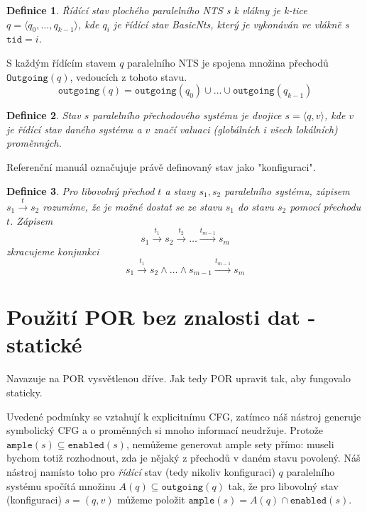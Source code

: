 \documentclass[10pt,a4paper,notitlepage]{report}
\newtheorem{definition}{Definice}
\newcommand{\tuple}[1]{\langle #1 \rangle}
\begin{document}
\begin{definition}
Řídící stav plochého paralelního NTS s k vlákny je k-tice $q = \tuple{q_0, \ldots, q_{k-1}}$, kde $q_i$ je řídící stav BasicNts, který je vykonáván ve vlákně s $\texttt{tid} = i$.
\end{definition}
S každým řídícím stavem $q$ paralelního NTS je spojena množina přechodů $\texttt{Outgoing}(q)$, vedoucích z tohoto stavu.
\begin{equation}
\texttt{outgoing}(q) = \texttt{outgoing}(q_0) \cup \ldots \cup \texttt{outgoing}(q_{k-1})
\end{equation}

\begin{definition}
Stav $s$ paralelního přechodového systému je dvojice $s = \tuple{q, v}$, kde $v$ je řídící stav daného systému a $v$ značí valuaci (globálních i všech lokálních) proměnných.
\end{definition}
Referenční manuál označujuje právě definovaný stav jako "konfiguraci".

\begin{definition}
Pro libovolný přechod $t$ a stavy $s_1, s_2$ paralelního systému, zápisem $s_1 \xrightarrow{t} s_2$ rozumíme, že je možné dostat se ze stavu $s_1$ do stavu $s_2$ pomocí přechodu $t$. Zápisem
\begin{equation*}
s_1 \xrightarrow{t_1} s_2 \xrightarrow{t_2} \ldots \xrightarrow{t_{m-1}} s_m
\end{equation*}
zkracujeme konjunkci
\begin{equation*}
s_1 \xrightarrow{t_1} s_2 \land \ldots \land s_{m-1} \xrightarrow{t_{m-1}} s_m
\end{equation*}
\end{definition}

\section{Použití POR bez znalosti dat - statické}
Navazuje na POR vysvětlenou dříve. Jak tedy POR upravit tak, aby fungovalo staticky.


Uvedené podmínky se vztahují k explicitnímu CFG, zatímco náš nástroj generuje symbolický CFG a o proměnných si mnoho informací neudržuje. Protože $\texttt{ample}(s) \subseteq \texttt{enabled}(s)$, nemůžeme generovat ample sety přímo: museli bychom totiž rozhodnout, zda je nějaký z přechodů v daném stavu povolený. Náš nástroj namísto toho pro \textit{řídící} stav (tedy nikoliv konfiguraci) $q$ paralelního systému spočítá množinu $A(q) \subseteq \texttt{outgoing}(q)$ tak, že pro libovolný stav (konfiguraci) $s = (q, v)$ můžeme položit $\texttt{ample}(s) = A(q) \cap \texttt{enabled}(s)$.
\end{document}
